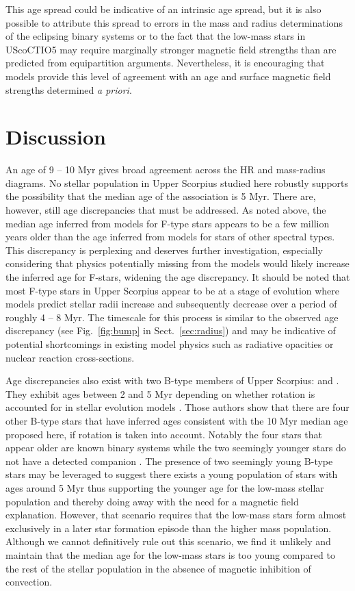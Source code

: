 \documentclass{aa}
\begin{document}
This age spread could be indicative of an intrinsic age spread, but it is also possible to attribute this spread to errors in the mass and radius determinations of the eclipsing binary systems or to the fact that the low-mass stars in UScoCTIO5 may require marginally stronger magnetic field strengths than are predicted from equipartition arguments. Nevertheless, it is encouraging that models provide this level of agreement with an age and surface magnetic field strengths determined \emph{a priori}. 

\section{Discussion}
\label{sec:disc}
An age of 9 -- 10 Myr gives broad agreement across the HR and mass-radius diagrams. No stellar population in Upper Scorpius studied here robustly supports the possibility that the median age of the association is 5 Myr. There are, however, still age discrepancies that must be addressed. As noted above, the median age inferred from models for F-type stars appears to be a few million years older than the age inferred from models for stars of other spectral types. This discrepancy is perplexing and deserves further investigation, especially considering that physics potentially missing from the models would likely increase the inferred age for F-stars, widening the age discrepancy. It should be noted that most F-type stars in Upper Scorpius appear to be at a stage of evolution where models predict stellar radii increase and subsequently decrease over a period of roughly 4 -- 8 Myr. The timescale for this process is similar to the observed age discrepancy (see Fig.~\ref{fig:bump} in Sect.~\ref{sec:radius}) and may be indicative of potential shortcomings in existing model physics such as radiative opacities or nuclear reaction cross-sections. 

Age discrepancies also exist with two B-type members of Upper Scorpius:  and . They exhibit ages between 2 and 5 Myr depending on whether rotation is accounted for in stellar evolution models \citep{Pecaut2012}. Those authors show that there are four other B-type stars that have inferred ages consistent with the 10 Myr median age proposed here, if rotation is taken into account. Notably the four stars that appear older are known binary systems while the two seemingly younger stars do not have a detected companion \citep{Pecaut2012}. The presence of two seemingly young B-type stars may be leveraged to suggest there exists a young population of stars with ages around 5 Myr thus supporting the younger age for the low-mass stellar population and thereby doing away with the need for a magnetic field explanation. However, that scenario requires that the low-mass stars form almost exclusively in a later star formation episode than the higher mass population. Although we cannot definitively rule out this scenario, we find it unlikely and maintain that the median age for the low-mass stars is too young compared to the rest of the stellar population in the absence of magnetic inhibition of convection.
\end{document}
